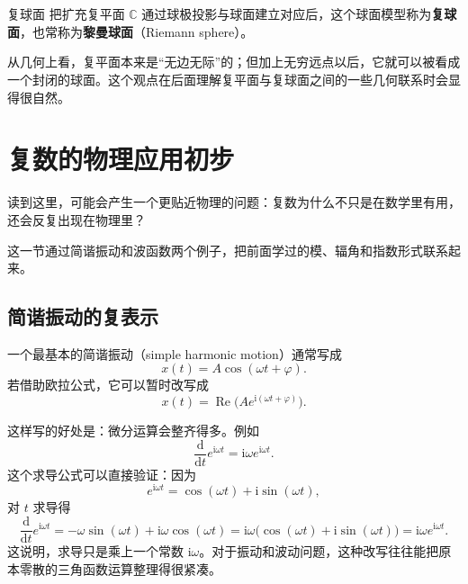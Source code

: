 \begin{dingliyi}{复球面}{}
把扩充复平面 $\hat{\mathbb{C}}$ 通过球极投影与球面建立对应后，这个球面模型称为\textbf{复球面}，也常称为\textbf{黎曼球面}（Riemann sphere）。
\end{dingliyi}

\begin{zhu}{}{}
从几何上看，复平面本来是``无边无际''的；但加上无穷远点以后，它就可以被看成一个封闭的球面。这个观点在后面理解复平面与复球面之间的一些几何联系时会显得很自然。
\end{zhu}

\section{复数的物理应用初步}

\begin{wulibj}[为什么复数会反复出现在物理里]
读到这里，可能会产生一个更贴近物理的问题：复数为什么不只是在数学里有用，还会反复出现在物理里？

这一节通过简谐振动和波函数两个例子，把前面学过的模、辐角和指数形式联系起来。
\end{wulibj}

\subsection{简谐振动的复表示}

一个最基本的简谐振动（simple harmonic motion）通常写成
\begin{equation}
    x(t)=A\cos(\omega t+\varphi).
\end{equation}
若借助欧拉公式，它可以暂时改写成
\begin{equation}
    x(t)=\operatorname{Re}\bigl(Ae^{\mathrm{i}(\omega t+\varphi)}\bigr).
\end{equation}

这样写的好处是：微分运算会整齐得多。例如
\begin{equation}
    \frac{\mathrm{d}}{\mathrm{d}t}e^{\mathrm{i}\omega t}=\mathrm{i}\omega e^{\mathrm{i}\omega t}.
\end{equation}
这个求导公式可以直接验证：因为
\[
e^{\mathrm{i}\omega t}=\cos(\omega t)+\mathrm{i}\sin(\omega t),
\]
对 $t$ 求导得
\[
\frac{\mathrm{d}}{\mathrm{d}t}e^{\mathrm{i}\omega t}=-\omega\sin(\omega t)+\mathrm{i}\omega\cos(\omega t)=\mathrm{i}\omega\bigl(\cos(\omega t)+\mathrm{i}\sin(\omega t)\bigr)=\mathrm{i}\omega e^{\mathrm{i}\omega t}.
\]
这说明，求导只是乘上一个常数 $\mathrm{i}\omega$。对于振动和波动问题，这种改写往往能把原本零散的三角函数运算整理得很紧凑。

